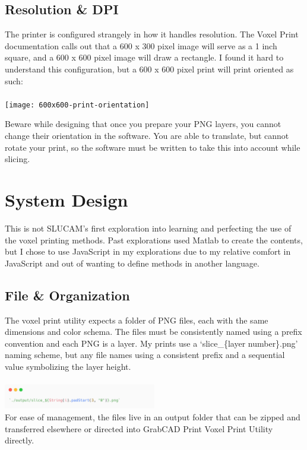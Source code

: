 \documentclass{article}
\begin{document}
\begin{multicols}{2}
\subsection{Resolution \& DPI}
The printer is configured strangely in how it handles resolution. The Voxel Print documentation calls out that a 600 x 300 pixel image will serve as a 1 inch square, and a 600 x 600 pixel image will draw a rectangle. I found it hard to understand this configuration, but a 600 x 600 pixel print will print oriented as such:
\\\\
\texttt{[image: 600x600-print-orientation]}

\noindent
Beware while designing that once you prepare your PNG layers, you cannot change their orientation in the software. You are able to translate, but cannot rotate your print, so the software must be written to take this into account while slicing. 

\section{System Design}

This is not SLUCAM's first exploration into learning and perfecting the use of the voxel printing methods. Past explorations used Matlab to create the contents, but I chose to use JavaScript in my explorations due to my relative comfort in JavaScript and out of wanting to define methods in another language.

\subsection{File \& Organization}
The voxel print utility expects a folder of PNG files, each with the same dimensions and color schema. The files must be consistently named using a prefix convention and each PNG is a layer. My prints use a `slice\_\{layer number\}.png' naming scheme, but any file names using a consistent prefix and a sequential value symbolizing the layer height.
\\\\
\noindent
\includegraphics[width=0.5\textwidth]{string-padding}
\\

\noindent
For ease of management, the files live in an output folder that can be zipped and transferred elsewhere or directed into GrabCAD Print Voxel Print Utility directly. 


\end{multicols}
\end{document}
